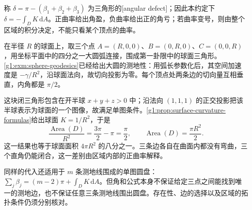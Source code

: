 称 \(\delta=\pi-(\beta_1+\beta_2+\beta_3)\) 为三角形的[angular defect]；因此本约定下 \(\delta=-\int_DK\,\mathrm{d}A\)。正曲率给出角盈，负曲率给出正的角亏；若曲率变号，则由整个区域的积分决定，不能只看某个顶点的曲率。

\begin{example}
	\label{g1:exm:spherical-octant}
	在半径 \(R\) 的球面上，取三个点 \(A=(R,0,0)\)、\(B=(0,R,0)\)、\(C=(0,0,R)\)，用坐标平面中的四分之一大圆弧连接，围成第一卦限中的球面三角形。\cref{g1:exm:sphere-geodesics}已经给出大圆的测地性：用弧长参数化后，其空间加速度是 \(-\gamma/R^2\)，沿球面法向，故切向投影为零。每个顶点处两条边的切向量互相垂直，内角都是 \(\pi/2\)。

	这块闭三角形包含在开半球 \(x+y+z>0\) 中；沿法向 \((1,1,1)\) 的正交投影把该半球表示为球面的一个图像，故满足单图条件。\cref{g1:prop:surface-curvature-formulas}给出球面 \(K=1/R^2\)，于是
	\[
		\frac{\operatorname{Area}(D)}{R^2}
		=\frac{3\pi}{2}-\pi=\frac\pi2,
		\qquad \operatorname{Area}(D)=\frac{\pi R^2}{2}.
	\]
	这一结果也等于球面面积 \(4\pi R^2\) 的八分之一。三条边各自在曲面内都没有弯曲，三个直角仍能闭合，这一差别由区域内部的正曲率解释。
\end{example}

同样的代入还适用于 \(m\) 条测地线围成的单图圆盘：\(\sum_j\beta_j=(m-2)\pi+\int_DK\,\mathrm{d}A\)。但角和公式本身不保证给定三点之间能找到唯一的测地边，也不保证任意三条测地线围出圆盘。存在性、边的选择以及区域的拓扑条件仍须分别核对。
